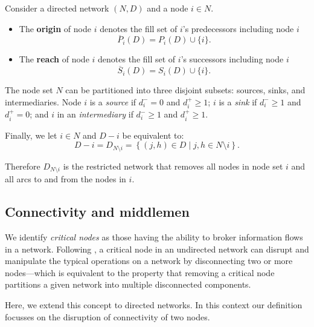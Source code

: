 \begin{definition} \label{coverage}
Consider a directed network $(N,D)$ and a node $i \in N$.
\begin{itemize}
\item The \textbf{origin} of node $i$ denotes the fill set of $i$'s predecessors including node $i$
\begin{equation}
\overline{P}_{i}(D) = P_{i}(D) \cup \{i\}.
\end{equation}
\item The \textbf{reach} of node $i$ denotes the fill set of $i$'s successors including node $i$
\begin{equation}
\overline{S}_{i}(D) = S_{i}(D) \cup \{i\}.
\end{equation}
\end{itemize}
\end{definition}

The node set $N$ can be partitioned into three disjoint subsets: sources, sinks, and intermediaries. Node $i$ is a \emph{source} if $d_{i}^{-} = 0$ and $d_{i}^{+} \geqslant 1$; $i$ is a \emph{sink} if $d_{i}^{-} \geqslant 1$ and $d_{i}^{+} = 0$; and $i$ in an \emph{intermediary} if $d_{i}^{-} \geqslant 1$ and $d_{i}^{+} \geqslant 1$.

Finally, we let $i \in N$ and $D-i$ be equivalent to:
\begin{equation}
D - i = D_{N \setminus i} = \left\{ (j,h) \in D \mid j,h \in N \setminus i \right\} .
\end{equation}

Therefore $D_{N \setminus i}$ is the restricted network that removes all nodes in node set $i$ and all arcs to and from the nodes in $i$.

\subsection{Connectivity and middlemen}

We identify \textit{critical nodes} as those having the ability to broker information flows in a network. Following \citet{GillesChakrabarti2006}, a critical node in an undirected network can disrupt and manipulate the typical operations on a network by disconnecting two or more nodes---which is equivalent to the property that removing a critical node partitions a given network into multiple disconnected components.

Here, we extend this concept to directed networks. In this context our definition focusses on the disruption of connectivity of two nodes.

